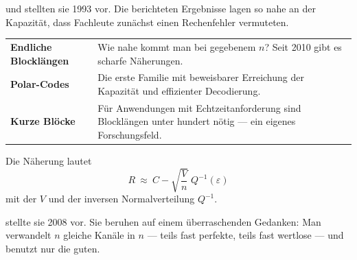 \begin{geschichte}
 und  stellten sie 1993 vor. Die berichteten Ergebnisse lagen so nahe an der Kapazität, dass Fachleute zunächst einen Rechenfehler vermuteten.

\begin{center}
\begin{minipage}{0.9\textwidth}
\end{minipage}
\end{center}
\end{geschichte}

\begin{forschung}
\begin{center}
{\small
\renewcommand{\arraystretch}{1.45}
\begin{tabular}{@{}P{2.8cm}P{5.4cm}@{}}
\toprule
\textbf{Endliche Blocklängen} & Wie nahe kommt man bei gegebenem $n$? Seit 2010 gibt es scharfe Näherungen.\\
\textbf{Polar-Codes} & Die erste Familie mit beweisbarer Erreichung der Kapazität und effizienter Decodierung.\\
\textbf{Kurze Blöcke} & Für Anwendungen mit Echtzeitanforderung sind Blocklängen unter hundert nötig --- ein eigenes Forschungsfeld.\\
\bottomrule
\end{tabular}}
\end{center}

Die Näherung lautet
\[ R \ \approx\ C - \sqrt{\frac{V}{n}}\;Q^{-1}(\varepsilon) \]
mit der  $V$ und der inversen Normalverteilung $Q^{-1}$.

\begin{center}
\begin{minipage}{0.88\textwidth}
\end{minipage}
\end{center}

 stellte sie 2008 vor. Sie beruhen auf einem überraschenden Gedanken: Man verwandelt $n$ gleiche Kanäle in $n$  --- teils fast perfekte, teils fast wertlose --- und benutzt nur die guten.


\end{forschung}
